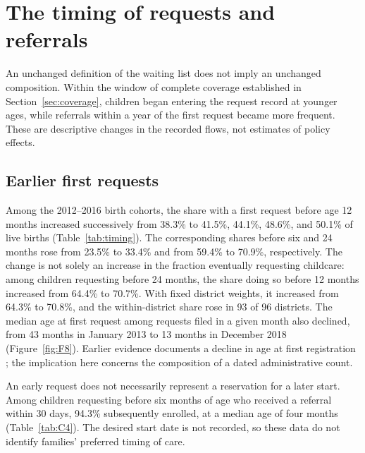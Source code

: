 
\section{The timing of requests and referrals}\label{sec:service}

An unchanged definition of the waiting list does not imply an unchanged composition. Within the window of complete coverage established in Section~\ref{sec:coverage}, children began entering the request record at younger ages, while referrals within a year of the first request became more frequent. These are descriptive changes in the recorded flows, not estimates of policy effects.

\subsection{Earlier first requests}\label{sec:timing}

Among the 2012--2016 birth cohorts, the share with a first request before age 12 months increased successively from 38.3\% to 41.5\%, 44.1\%, 48.6\%, and 50.1\% of live births (Table~\ref{tab:timing}). The corresponding shares before six and 24 months rose from 23.5\% to 33.4\% and from 59.4\% to 70.9\%, respectively. The change is not solely an increase in the fraction eventually requesting childcare: among children requesting before 24 months, the share doing so before 12 months increased from 64.4\% to 70.7\%. With fixed district weights, it increased from 64.3\% to 70.8\%, and the within-district share rose in 93 of 96 districts. The median age at first request among requests filed in a given month also declined, from 43 months in January 2013 to 13 months in December 2018 (Figure~\ref{fig:F8}). Earlier evidence documents a decline in age at first registration \citep{soares2021ecd}; the implication here concerns the composition of a dated administrative count.

An early request does not necessarily represent a reservation for a later start. Among children requesting before six months of age who received a referral within 30 days, 94.3\% subsequently enrolled, at a median age of four months (Table~\ref{tab:C4}). The desired start date is not recorded, so these data do not identify families' preferred timing of care.

